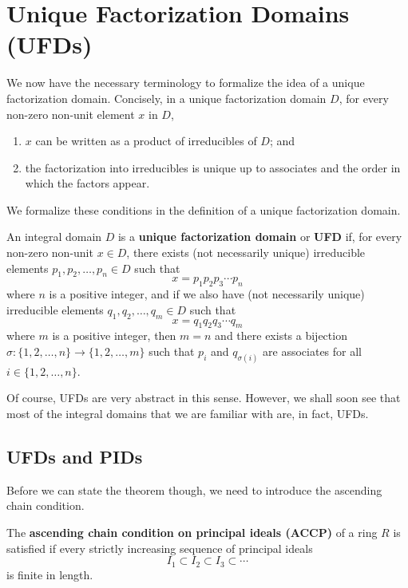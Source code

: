 \section{Unique Factorization Domains (UFDs)}
We now have the necessary terminology to formalize the idea of a unique factorization domain. Concisely, in a unique factorization domain $D$, for every non-zero non-unit element $x$ in $D$,
\begin{enumerate}
    \item $x$ can be written as a product of irreducibles of $D$; and
    \item the factorization into irreducibles is unique up to associates and the order in which the factors appear.
\end{enumerate}

We formalize these conditions in the definition of a unique factorization domain.

\begin{definition}
    An integral domain $D$ is a \textbf{unique factorization domain} or \textbf{UFD} if, for every non-zero non-unit $x \in D$, there exists (not necessarily unique) irreducible elements $p_1, p_2, \dots, p_n \in D$ such that
    \[
        x = p_1p_2p_3\cdots p_n
    \]
    where $n$ is a positive integer, and if we also have (not necessarily unique) irreducible elements $q_1, q_2, \dots, q_m \in D$ such that
    \[
        x = q_1q_2q_3\cdots q_m
    \]
    where $m$ is a positive integer, then $m = n$ and there exists a bijection $\sigma: \{1,2,\dots,n\} \to \{1,2,\dots,m\}$ such that $p_i$ and $q_{\sigma(i)}$ are associates for all $i \in \{1,2,\dots,n\}$.
\end{definition}

Of course, UFDs are very abstract in this sense. However, we shall soon see that most of the integral domains that we are familiar with are, in fact, UFDs.

\subsection{UFDs and PIDs}
Before we can state the theorem though, we need to introduce the ascending chain condition.

\begin{definition}
    The \textbf{ascending chain condition on principal ideals (ACCP)} of a ring $R$ is satisfied if every strictly increasing sequence of principal ideals 
    \[
        I_1 \subset I_2 \subset I_3 \subset \cdots
    \]
    is finite in length.
\end{definition}

